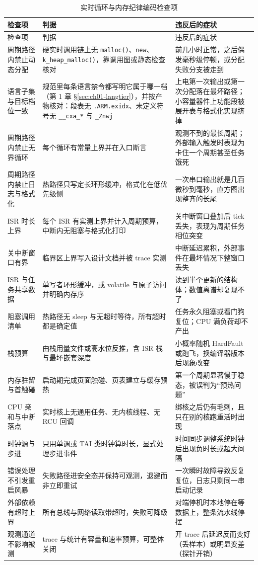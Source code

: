 \documentclass[12pt,a4paper,fontset=fandol]{ctexbook}
\newcommand{\Fn}[1]{\texttt{#1()}}
\newcommand{\Tp}[1]{\texttt{#1}}
\begin{document}
\begin{longtable}{>{\raggedright\arraybackslash\footnotesize}p{} >{\raggedright\arraybackslash\footnotesize}p{} >{\raggedright\arraybackslash\footnotesize}p{}}
\caption{实时循环与内存纪律编码检查项}\label{tab:apB-discipline} \\
\toprule 检查项 & 判据 & 违反后的症状 \\ \midrule
\endfirsthead
\toprule 检查项 & 判据 & 违反后的症状 \\ \midrule
\endhead
\bottomrule \endfoot
\endlastfoot
周期路径内禁止动态分配 & 硬实时调用链上无 \Fn{malloc}、\Tp{new}、\Fn{k\_heap\_malloc}，靠调用图或静态检查核对 & 前几小时正常，之后偶发毫秒级停顿，或分配失败分支被走到 \\
语言子集与目标档位一致 & 规范里每条语言禁令都写明它属于哪一档（第 1 章 \S\ref{sec:ch01-langtier}），并按产物核对：段表无 \Tp{.ARM.exidx}、未定义符号无 \Tp{\_\_cxa\_*} 与 \Tp{\_Znwj} & 上电第一次输出或第一次分配落在最坏路径；小容量器件上功能段被展开表与格式化实现挤掉 \\
周期路径内禁止无界循环 & 每个循环有常量上界并在入口断言 & 观测不到的最长周期；外部输入触发时表现为卡住一个周期甚至任务饿死 \\
周期路径内禁止日志与格式化 & 热路径只写定长环形缓冲，格式化在低优先级侧 & 一次串口输出就是几百微秒到毫秒，直方图出现整齐的长尾 \\
ISR 时长上界 & 每个 ISR 有实测上界并计入周期预算，中断内无阻塞与格式化打印 & 关中断窗口叠加后 tick 丢失，表现为周期任务相位突变 \\
关中断窗口有界 & 临界区上界写入设计文档并被 trace 实测 & 中断延迟累积，外部事件在最坏情况下整窗口丢失 \\
ISR 与任务共享数据 & 单写者环形缓冲，或 volatile 与原子访问并明确内存序 & 读到半个更新的结构体；数值离谱却复现不了 \\
阻塞调用清单 & 热路径无 sleep 与无超时等待，所有超时都是确定值 & 任务永久阻塞或看门狗复位；CPU 满负荷却不产出 \\
栈预算 & 由栈用量文件或高水位反推，含 ISR 栈与最坏嵌套深度 & 小概率随机 HardFault 或跑飞，换编译器版本后现象改变 \\
内存驻留与首触碰 & 启动期完成页面触碰、页表建立与缓存预热 & 第一个周期显著慢于稳态，被误判为``预热问题'' \\
CPU 亲和与中断落点 & 实时核上无通用任务、无内核线程、无 RCU 回调 & 绑核之后仍有毛刺，且只在别的核跑重活时出现 \\
时钟源与步进 & 只用单调或 TAI 类时钟算时长，显式处理步进事件 & 时间同步调整系统时钟后出现负时长或超大间隔 \\
错误处理不引发重启风暴 & 失败路径进安全态并保持可观测，退避而非立即重试 & 一次瞬时故障导致反复复位，日志只剩同一串启动记录 \\
外部依赖有超时上界 & 所有总线与网络读取带超时，失败可降级 & 对端停机时本地停在等数据上，整条流水线停摆 \\
观测通道不影响被测 & trace 与统计有容量和速率预算，可整体关闭 & 开 trace 后延迟反而变好（丢样本）或明显变差（探针开销） \\
\end{longtable}
\end{document}
